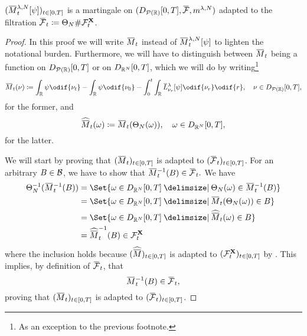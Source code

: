 \begin{proposition}\label{prop:emp-M-mart}
  \((\ol{M}_t^{\lambda, N}[\psi])_{t\in[0,T]}\) is a martingale on \((D_{\cP(\potspace)}[0,T], \ol{\cF}, \lawmu^{\lambda,N})\) adapted to the filtration \mbox{\( \ol{\cF}_t \coloneqq \Theta_N \# \cF_t^{\bm{X}} \)}.
\end{proposition}
\begin{proof}
  In this proof we will write \( \ol{M}_t \) instead of \( \ol{M}_t^{\lambda, N}[\psi] \) to lighten the notational burden.
  Furthermore, we will have to distinguish between \( \ol{M}_t \) being a function on \( D_{\mathcal{P}(\mathbb{R})}[0,T] \) or on \( D_{\mathbb{R}^N}[0,T] \), which we will do by writing\footnote{As an exception to the previous footnote.}
  \begin{equation}
    \ol{M}_t(\nu) \coloneqq \int_\potspace \psi \odif{\nu_t} - \int_\potspace \psi \odif{\nu_0}
    - \int_0^t \int_\potspace \ol{L}_{\nu_r}^{\lambda} [\psi] \odif{\nu_r} \odif{r},
    \quad \nu \in D_{\cP(\potspace)}[0,T],
  \end{equation}
  for the former, and
  \begin{equation}
    \widehat{\ol{M}}_t(\bm{\omega}) \coloneqq \ol{M}_t(\Theta_N(\bm{\omega})), \quad \bm{\omega} \in D_{\potspace^N}[0,T],
  \end{equation}
  for the latter.

  We will start by proving that \( (\ol{M}_t)_{t\in[0,T]} \) is adapted to \( (\ol{\cF}_t)_{t\in[0,T]} \).
  For an arbitrary \( B \in \mathcal{B} \), we have to show that
  \mbox{\begin{math}
    \ol{M}_t^{-1} (B) \in \ol{\cF}_t.
  \end{math}}
  We have
  \begin{equation}
    \begin{split}
      \Theta_N^{-1}(\ol{M}_t^{-1} (B))
       & = \Set{ \bm{\omega} \in D_{\potspace^N}[0,T] \given \Theta_N(\bm{\omega}) \in \ol{M}_t^{-1} (B) } \\
       & = \Set{ \bm{\omega} \in D_{\potspace^N}[0,T] \given \ol{M}_t(\Theta_N(\bm{\omega})) \in B }       \\
       & = \Set{ \bm{\omega} \in D_{\potspace^N}[0,T] \given \widehat{\ol{M}}_t(\bm{\omega}) \in B } \\
       & = \widehat{\ol{M}}_t^{-1}(B) \in \cF_t^{\bm{X}}
    \end{split}
  \end{equation}
  where the inclusion holds because \( (\widehat{\ol{M}})_{t\in[0,T]} \) is adapted to \( (\mathcal{F}_t^{\mathbf{X}})_{t\in[0,T]} \) by .
  This implies, by definition of \( \ol{\cF}_t \), that
  \begin{equation}
    \ol{M}_t^{-1} (B) \in \ol{\cF}_t,
  \end{equation}
  proving that \( (\ol{M}_t)_{t\in[0,T]} \) is adapted to \( (\ol{\cF}_t)_{t\in[0,T]} \).


\end{proof}
